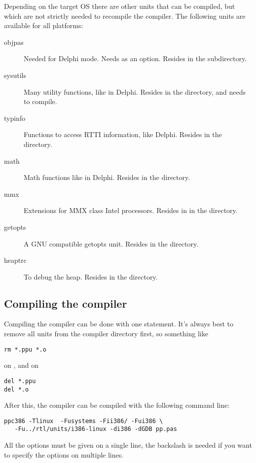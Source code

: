 Depending on the target OS there are other units that can be 
compiled, but which are not strictly needed to recompile the compiler.
The following units are available for all platforms:
\begin{description}
\item[objpas] Needed for Delphi mode. Needs  as an option. Resides
in the  subdirectory.
\item[sysutils] Many utility functions, like in Delphi. Resides in the
 directory, and needs  to compile.
\item[typinfo] Functions to access RTTI information, like Delphi. Resides in
the  directory.
\item[math] Math functions like in Delphi. Resides in the 
directory.
\item[mmx] Extensions for MMX class Intel processors. Resides in
in the  directory.
\item[getopts] A GNU compatible getopts unit. Resides in the 
directory.
\item[heaptrc] To debug the heap. Resides in the  directory.
\end{description}

\subsection{Compiling the compiler}

Compiling the compiler can be done with one statement. It's always best to
remove all units from the compiler directory first, so something like
\begin{verbatim}
rm *.ppu *.o
\end{verbatim}
on \linux, and on \dos
\begin{verbatim}
del *.ppu
del *.o
\end{verbatim}
After this, the compiler can be compiled with the following command line:
\begin{verbatim}
ppc386 -Tlinux  -Fusystems -Fii386/ -Fui386 \
   -Fu../rtl/units/i386-linux -di386 -dGDB pp.pas
\end{verbatim}
All the options must be given on a single line, the backslash is needed if
you want to specify the options on multiple lines.

